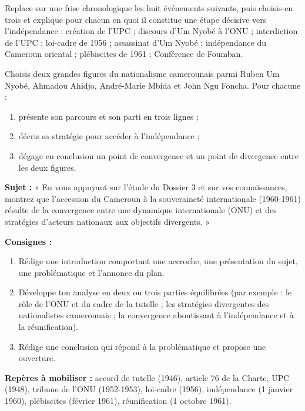 \documentclass[11pt]{article}
\newcounter{popsec}
\newcounter{popsub}
\newcommand{\courssub}[1]{%
  \stepcounter{popsub}%
  \par\vspace{9pt}\noindent{\popxbold\fontsize{11.5}{13}\selectfont\color{popink}{\color{poporange}\thepopsec.\thepopsub}\hspace{6pt}#1}\par\nopagebreak\vspace{4pt}
}
\begin{document}
\begin{exercice}
Replace sur une frise chronologique les huit événements suivants, puis choisis-en trois et explique pour chacun en quoi il constitue une étape décisive vers l'indépendance : création de l'UPC ; discours d'Um Nyobé à l'ONU ; interdiction de l'UPC ; loi-cadre de 1956 ; assassinat d'Um Nyobé ; indépendance du Cameroun oriental ; plébiscites de 1961 ; Conférence de Foumban.
\end{exercice}

\begin{exercice}
Choisis deux grandes figures du nationalisme camerounais parmi Ruben Um Nyobé, Ahmadou Ahidjo, André-Marie Mbida et John Ngu Foncha. Pour chacune :
\begin{enumerate}
\item présente son parcours et son parti en trois lignes ;
\item décris sa stratégie pour accéder à l'indépendance ;
\item dégage en conclusion un point de convergence et un point de divergence entre les deux figures.
\end{enumerate}
\end{exercice}

\courssub{Je me prépare au Bac}

\begin{exercice}
\textbf{Sujet :} « En vous appuyant sur l'étude du Dossier 3 et sur vos connaissances, montrez que l'accession du Cameroun à la souveraineté internationale (1960-1961) résulte de la convergence entre une dynamique internationale (ONU) et des stratégies d'acteurs nationaux aux objectifs divergents. »

\textbf{Consignes :}
\begin{enumerate}
\item Rédige une introduction comportant une accroche, une présentation du sujet, une problématique et l'annonce du plan.
\item Développe ton analyse en deux ou trois parties équilibrées (par exemple : le rôle de l'ONU et du cadre de la tutelle ; les stratégies divergentes des nationalistes camerounais ; la convergence aboutissant à l'indépendance et à la réunification).
\item Rédige une conclusion qui répond à la problématique et propose une ouverture.
\end{enumerate}
\textbf{Repères à mobiliser :} accord de tutelle (1946), article 76 de la Charte, UPC (1948), tribune de l'ONU (1952-1953), loi-cadre (1956), indépendance (1\ier{} janvier 1960), plébiscites (février 1961), réunification (1\ier{} octobre 1961).
\end{exercice}
\end{document}
